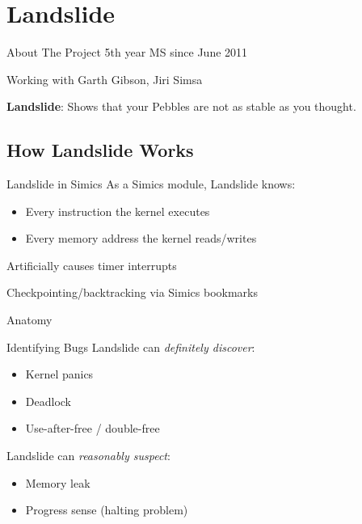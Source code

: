 \documentclass[xcolor=dvipsnames]{beamer}
\begin{document}

\section{Landslide}


\begin{frame}{About The Project}
	5th year MS since June 2011 %

	\linegap
	Working with Garth Gibson, Jiri Simsa

	\linegap
	{\bf Landslide}: Shows that your Pebbles are not as stable as you thought.
\end{frame}


\subsection{How Landslide Works}

\begin{frame}{Landslide in Simics}
	As a Simics module, Landslide knows:
	\begin{itemize}
		\item Every instruction the kernel executes
		\item Every memory address the kernel reads/writes
	\end{itemize}
	\linegap
	Artificially causes timer interrupts

	\linegap
	Checkpointing/backtracking via Simics bookmarks
\end{frame}

\begin{frame}{Anatomy}
	\begin{center}
	\end{center}
\end{frame}

\begin{frame}{Identifying Bugs}
	Landslide can {\em definitely discover}:
	\begin{itemize}
		\item Kernel panics %
		\item Deadlock
		\item Use-after-free / double-free
	\end{itemize}
	Landslide can {\em reasonably suspect}:
	\begin{itemize}
		\item Memory leak
		\item Progress sense (halting problem)
	\end{itemize}
\end{frame}
\end{document}
